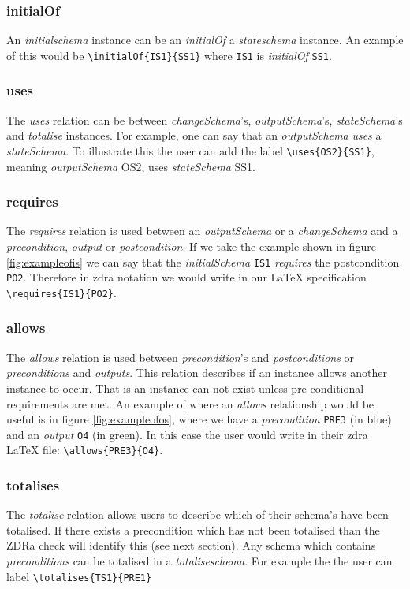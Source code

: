 \subsubsection{initialOf}

An \emph{initialschema} instance can be an \emph{initialOf} a \emph{stateschema}
instance. An example of this would be \verb|\initialOf{IS1}{SS1}| where
\verb|IS1| is \emph{initialOf} \verb|SS1|.

\subsubsection{uses}
The \emph{uses} relation can be between \emph{changeSchema}'s,
\emph{outputSchema}'s, \emph{stateSchema}'s and \emph{totalise} instances. For
example, one can say that an \emph{outputSchema} \emph{uses} a
\emph{stateSchema}. To illustrate this the user can add the label
\verb|\uses{OS2}{SS1}|, meaning \emph{outputSchema} OS2, uses \emph{stateSchema}
SS1.

\subsubsection{requires}
The \emph{requires} relation is used between an \emph{outputSchema} or a
\emph{changeSchema} and a \emph{precondition}, \emph{output} or
\emph{postcondition}. If we take the example shown in figure
\ref{fig:exampleofis} we can say that the \emph{initialSchema} \verb|IS1|
\emph{requires} the postcondition \verb|PO2|. Therefore in \gls{zdra} notation
we would write in our \LaTeX{} specification \verb|\requires{IS1}{PO2}|.

\subsubsection{allows}
The \emph{allows} relation is used between \emph{precondition}'s and
\emph{postconditions} or \emph{preconditions} and \emph{outputs}. This relation
describes if an instance allows another instance to occur. That is an instance
can not exist unless pre-conditional requirements are met. An example of where
an \emph{allows} relationship would be useful is in figure
\ref{fig:exampleofos}, where we have a \emph{precondition} \verb|PRE3| (in blue)
and an \emph{output} \verb|O4| (in green). In this case the user would write in
their \gls{zdra} \LaTeX{} file: \verb|\allows{PRE3}{O4}|.

\subsubsection{totalises}
The \emph{totalise} relation allows users to describe which of their schema's
have been totalised. If there exists a precondition which has not been totalised
than the ZDRa check will identify this (see next section). Any schema which
contains \emph{preconditions} can be totalised in a \emph{totaliseschema}. For
example the the user can label \verb|\totalises{TS1}{PRE1}|


